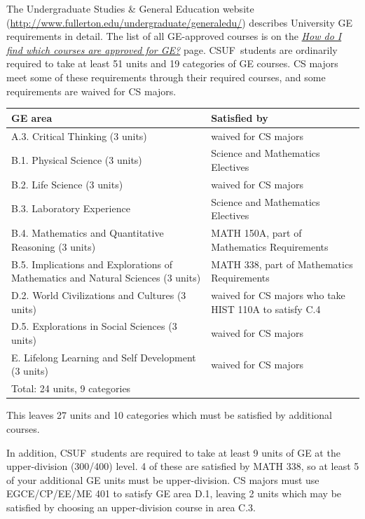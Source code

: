 \documentclass{book}
\newcommand{\CampusName}{CSUF}
\begin{document}
\newcommand{\gecourselist}{ \href{http://www.fullerton.edu/undergraduate/generaledu/ge_approvedcourses.asp}{\emph{How do I find which courses are approved for GE?}} }

The Undergraduate Studies \& General Education website (\url{http://www.fullerton.edu/undergraduate/generaledu/}) describes University GE requirements in detail. The list of all GE-approved courses is on the \gecourselist page. \CampusName~students are ordinarily required to take at least 51 units and 19 categories of GE courses. CS majors meet some of these requirements through their required courses, and some requirements are waived for CS majors.

\begin{center}
\begin{tabular}{| p{3in} | p{3in} |} \hline
  \textbf{GE area} & \textbf{Satisfied by} \\ \hline
  A.3. Critical Thinking (3 units) & waived for CS majors \\ \hline
  B.1. Physical Science (3 units) & Science and Mathematics Electives \\ \hline
  B.2. Life Science (3 units) & waived for CS majors \\ \hline
  B.3. Laboratory Experience & Science and Mathematics Electives \\ \hline
  B.4. Mathematics and Quantitative Reasoning (3 units) & MATH 150A, part of Mathematics Requirements \\ \hline
  B.5. Implications and Explorations of Mathematics and Natural Sciences (3 units) & MATH 338, part of Mathematics Requirements \\ \hline
  D.2. World Civilizations and Cultures (3 units) & waived for CS majors who take HIST 110A to satisfy C.4 \\ \hline
  D.5. Explorations in Social Sciences (3 units) & waived for CS majors \\ \hline
  E. Lifelong Learning and Self Development (3 units) & waived for CS majors \\ \hline
  \multicolumn{2}{|l|}{Total: 24 units, 9 categories} \\ \hline
\end{tabular}
\end{center}

This leaves 27 units and 10 categories which must be satisfied by additional courses.

In addition, \CampusName~students are required to take at least 9 units of GE at the upper-division (300/400) level. 4 of these are satisfied by MATH 338, so at least 5 of your additional GE units must be upper-division. CS majors must use EGCE/CP/EE/ME 401 to satisfy GE area D.1, leaving 2 units which may be satisfied by choosing an upper-division course in area C.3.
\end{document}
